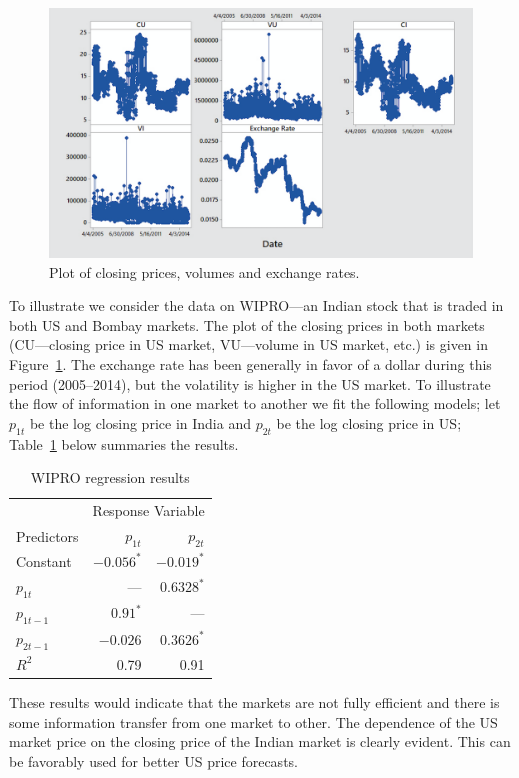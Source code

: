        \begin{figure}[!ht]
        \centering
        \includegraphics[width=\textwidth]{chapters/chapter_stat_ts/figures/cpver.png}
        \caption{Plot of closing prices, volumes and exchange rates. \label{fig:cpver}}
        \end{figure}


To illustrate we consider the data on WIPRO---an Indian stock that is traded in both US and Bombay markets. The plot of the closing prices in both markets (CU---closing price in US market, VU---volume in US market, etc.) is given in Figure~\ref{fig:cpver}. The exchange rate has been generally in favor of a dollar during this period (2005--2014), but the volatility is higher in the US market. To illustrate the flow of information in one market to another we fit the following models; let $p_{1t}$ be the log closing price in India and $p_{2t}$ be the log closing price in US; Table~\ref{tab:regresul} below summaries the results.
	\begin{table}[!ht] 
	\centering
	\caption{WIPRO regression results \label{tab:regresul}}
	\begin{tabular}{l | rr} 
	& \multicolumn{2}{c}{Response Variable} \\ 
	Predictors & $p_{1t}$ & $p_{2t}$ \\ \hline 
	Constant & $-0.056^*$ & $-0.019^*$ \\
	$p_{1t}$ & ---  & $0.6328^*$ \\
	$p_{1t-1}$ & $0.91^*$ & --- \\
	$p_{2t-1}$ & $-0.026$ & $0.3626^*$ \\ \hline
	$R^2$ & 0.79 & 0.91 
	\end{tabular}
	\end{table}
These results would indicate that the markets are not fully efficient and there is some information transfer from one market to other. The dependence of the US market price on the closing price of the Indian market is clearly evident. This can be favorably used for better US price forecasts. 



